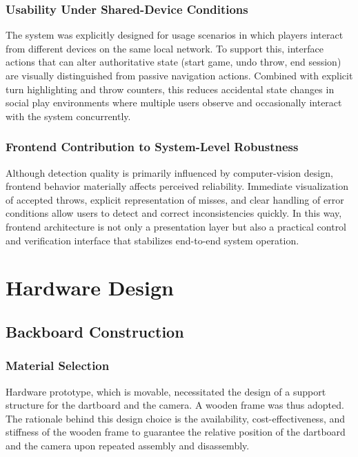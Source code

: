 \subsubsection{Usability Under Shared-Device Conditions}
The system was explicitly designed for usage scenarios in which players interact from different devices on the same local network. To support this, interface actions that can alter authoritative state (start game, undo throw, end session) are visually distinguished from passive navigation actions. Combined with explicit turn highlighting and throw counters, this reduces accidental state changes in social play environments where multiple users observe and occasionally interact with the system concurrently.

\subsubsection{Frontend Contribution to System-Level Robustness}
Although detection quality is primarily influenced by computer-vision design, frontend behavior materially affects perceived reliability. Immediate visualization of accepted throws, explicit representation of misses, and clear handling of error conditions allow users to detect and correct inconsistencies quickly. In this way, frontend architecture is not only a presentation layer but also a practical control and verification interface that stabilizes end-to-end system operation.

\setauthor{\secondauthor}

\section{Hardware Design}
\subsection{Backboard Construction}

\subsubsection{Material Selection}
Hardware prototype, which is movable, necessitated the design of a support structure for the dartboard and the camera. A wooden frame was thus adopted. The rationale behind this design choice is the availability, cost-effectiveness, and stiffness of the wooden frame to guarantee the relative position of the dartboard and the camera upon repeated assembly and disassembly.

